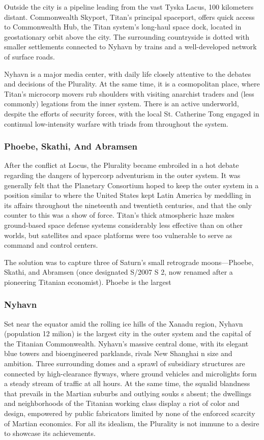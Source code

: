 Outside the city is a pipeline leading from the 
vast Tyska Lacus, 100 kilometers distant. Commonwealth Skyport, Titan's principal spaceport, offers 
quick access to Commonwealth Hub, the Titan system's long-haul space dock, located in geostationary 
orbit above the city. The surrounding countryside 
is dotted with smaller settlements connected to 
Nyhavn by trains and a well-developed network of 
surface roads.

Nyhavn is a major media center, with daily life 
closely attentive to the debates and decisions of 
the Plurality. At the same time, it is a cosmopolitan 
place, where Titan's microcorp movers rub shoulders 
with visiting anarchist traders and (less commonly) 
legations from the inner system. There is an active 
underworld, despite the efforts of security forces, 
with the local St. Catherine Tong engaged in continual low-intensity warfare with triads from throughout 
the system.

\subsubsection{Phoebe, Skathi, And Abramsen}

After the conflict at Locus, the Plurality became 
embroiled in a hot debate regarding the dangers of 
hypercorp adventurism in the outer system. It was 
generally felt that the Planetary Consortium hoped to 
keep the outer system in a position similar to where 
the United States kept Latin America by meddling in 
its affairs throughout the nineteenth and twentieth 
centuries, and that the only counter to this was a 
show of force. Titan's thick atmospheric haze makes 
ground-based space defense systems considerably 
less effective than on other worlds, but satellites and 
space platforms were too vulnerable to serve as command and control centers.

The solution was to capture three of Saturn's small 
retrograde moons—Phoebe, Skathi, and Abramsen 
(once designated S/2007 S 2, now renamed after a 
pioneering Titanian economist). Phoebe is the largest 

\subsubsection{Nyhavn}

Set near the equator amid the rolling ice 
hills of  the Xanadu region, 
Nyhavn (population 12 milion) is the largest city in the outer
system and the capital of the Titanian 
Commonwealth. Nyhavn's massive central dome, with its elegant blue towers and 
bioengineered parklands, rivals New Shanghai 
n size and ambition. Three surrounding  domes 
and a sprawl of subsidiary structures are connected
by  high-clearance  flyways, where  ground vehicles
and microlights form a steady stream of traffic at all
hours. At the same time, the squalid blandness that
prevails in the Martian suburbs and outlying souks
s absent; the dwellings and neighborhoods of the 
Titanian working class display a riot of color and
design, empowered by public fabricators limited by
none of the enforced scarcity of Martian economics.
For all its idealism, the Plurality is not immune to a
desire to showcase its achievements.

